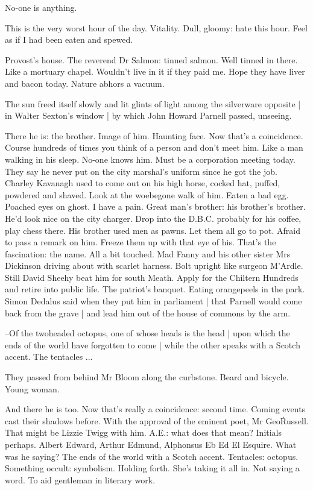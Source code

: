 No-one is anything.

This is the very worst hour of the day.
Vitality.
Dull, gloomy:
hate this hour.
Feel as if I had been eaten and spewed.

Provost's house.
The reverend Dr Salmon:
tinned salmon.
Well tinned in there.
Like a mortuary chapel.
Wouldn't live in it if they paid me.
Hope they have liver and bacon today.
Nature abhors a vacuum.

The sun freed itself slowly
and lit glints of light among the silverware opposite |
in Walter Sexton's window |
by which John Howard Parnell passed,
unseeing.

There he is:
the brother.
Image of him.
Haunting face.
Now that's a coincidence.
Course hundreds of times you think of a person and don't meet him.
Like a man walking in his sleep.
No-one knows him.
Must be a corporation meeting today.
They say he never put on the city marshal's uniform since he got the job.
Charley Kavanagh used to come out on his high horse,
cocked hat,
puffed, powdered and shaved.
Look at the woebegone walk of him.
Eaten a bad egg.
Poached eyes on ghost.
I have a pain.
Great man's brother:
his brother's brother.
He'd look nice on the city charger.
Drop into the D.B.C.
probably for his coffee,
play chess there.
His brother used men as pawns.
Let them all go to pot.
Afraid to pass a remark on him.
Freeze them up with that eye of his.
That's the fascination:
the name.
All a bit touched.
Mad Fanny and his other sister Mrs Dickinson driving about with scarlet harness.
Bolt upright like surgeon M'Ardle.
Still David Sheehy beat him for south Meath.
Apply for the Chiltern Hundreds and retire into public life.
The patriot's banquet.
Eating orangepeels in the park.
Simon Dedalus said when they put him in parliament |
that Parnell would come back from the grave |
and lead him out of the house of commons by the arm.

--Of the twoheaded octopus,
one of whose heads is the head |
upon which the ends of the world have forgotten to come |
while the other speaks with a Scotch accent.
The tentacles ...

They passed from behind Mr Bloom along the curbstone.
Beard and bicycle.
Young woman.

And there he is too.
Now that's really a coincidence:
second time.
Coming events cast their shadows before.
With the approval of the eminent poet,
Mr Geo\. Russell.
That might be Lizzie Twigg with him.
A.E.:
what does that mean?
Initials perhaps.
Albert Edward,
Arthur Edmund,
Alphonsus Eb Ed El Esquire.
What was he saying?
The ends of the world with a Scotch accent.
Tentacles:
octopus.
Something occult:
symbolism.
Holding forth.
She's taking it all in.
Not saying a word.
To aid gentleman in literary work.

